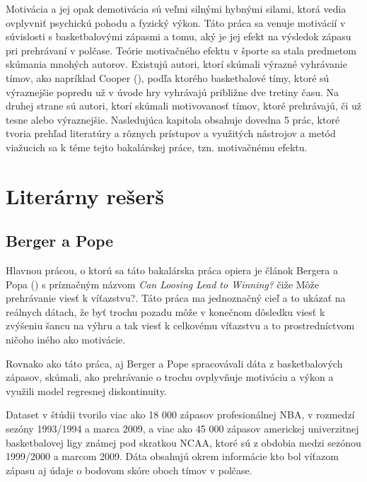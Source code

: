 \documentclass[
  digital, %
  oneside, %
  notable,   %
  lof,     %
  lot,     %
]{fithesis3}
\begin{document}
		Motivácia a jej opak demotivácia sú veľmi silnými hybnými silami, ktorá vedia ovplyvniť psychickú pohodu a fyzický výkon. Táto práca sa venuje motivácií v súvislosti s basketbalovými zápasmi a tomu, aký je jej efekt na výsledok zápasu pri prehrávaní v polčase. Teórie motivačného efektu v športe sa stala predmetom skúmania mnohých autorov. Existujú autori, ktorí skúmali výrazné vyhrávanie tímov, ako napríklad Cooper (\citeyear{cooper1992}), podľa ktorého basketbalové tímy, ktoré sú výraznejšie popredu už v úvode hry vyhrávajú približne dve tretiny času. Na druhej strane sú autori, ktorí skúmali motivovanosť tímov, ktoré prehrávajú, či už tesne alebo výraznejšie. Nasledujúca kapitola obsahuje dovedna 5 prác, ktoré tvoria prehľad literatúry a rôznych prístupov a využitých nástrojov a metód viažucich sa k téme tejto bakalárskej práce, tzn. motivačnému efektu.
		
	\chapter{Literárny rešerš}
		\section{Berger a Pope}
		\label{sec:Berger}
		Hlavnou prácou, o ktorú sa táto bakalárska práca opiera je článok Bergera a Popa (\citeyear{berger2011}) s príznačným názvom \textit{Can Loosing Lead to Winning?} čiže Môže prehrávanie viesť k víťazstvu?. Táto práca ma jednoznačný cieľ a to ukázať na reálnych dátach, že byť trochu pozadu môže v konečnom dôsledku viesť k zvýšeniu šancu na výhru a tak viesť k celkovému víťazstvu a to prostredníctvom ničoho iného ako motivácie.
		
		Rovnako ako táto práca, aj Berger a Pope spracovávali dáta z basketbalových zápasov, skúmali, ako prehrávanie o trochu ovplyvňuje motiváciu a výkon a využili model regresnej diskontinuity. 
		
		Dataset v štúdii tvorilo viac ako 18 000 zápasov profesionálnej NBA, v rozmedzí sezóny 1993/1994 a marca 2009, a viac ako 45 000 zápasov americkej univerzitnej basketbalovej ligy známej pod skratkou NCAA, ktoré sú z obdobia medzi sezónou 1999/2000 a marcom 2009. \parencite[s.~818]{berger2011} Dáta obsahujú okrem informácie kto bol víťazom zápasu aj údaje o bodovom skóre oboch tímov v polčase.
		
\end{document}
